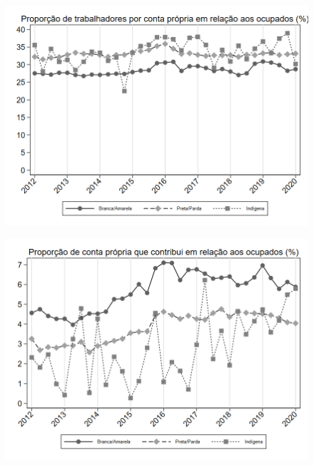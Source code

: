 \begin{frame}[label=_composicao_demografica_raca_prop_cpropria]{}
\textit{\hyperlink{_composicao_demografica_raca}{}}
\begin{figure}
  \centering
  \includegraphics[width=1.0\linewidth]{../../analysis/output/composicao_demografica/raca/_composicao_demografica_raca_prop_cpropria.png}
  \caption{}
  \label{fig:_composicao_demografica_raca_prop_cpropria}
\end{figure}
\end{frame}

\begin{frame}[label=_composicao_demografica_raca_prop_cpropriaC]{}
\textit{\hyperlink{_composicao_demografica_raca}{}}
\begin{figure}
  \centering
  \includegraphics[width=1.0\linewidth]{../../analysis/output/composicao_demografica/raca/_composicao_demografica_raca_prop_cpropriaC.png}
  \caption{}
  \label{fig:_composicao_demografica_raca_prop_cpropriaC}
\end{figure}
\end{frame}

